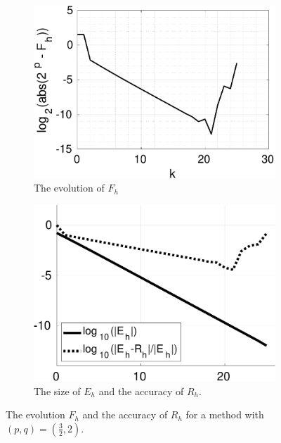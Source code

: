 \documentclass[runningheads]{llncs}
\begin{document}

\begin{figure}
\begin{subfigure}[h]{0.49\linewidth}
\includegraphics[width=\linewidth]{rint_mwe2a.pdf}
\caption{The evolution of $F_h$} \label{fig:rint_mwe2a}
\end{subfigure}
\hfill
\begin{subfigure}[h]{0.49\linewidth}
\includegraphics[width=\linewidth]{rint_mwe2b.pdf}
\caption{The size of $E_h$ and the accuracy of $R_h$.} \label{fig:rint_mwe2b}
\end{subfigure}%
\caption{The evolution $F_h$ and the accuracy of $R_h$ for a method with $(p,q) = (\frac{3}{2},2)$.}
\end{figure}
\end{document}

